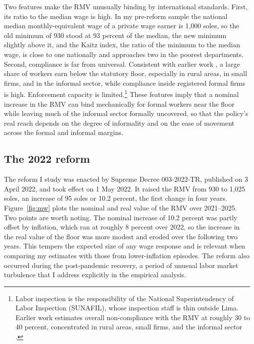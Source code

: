 Two features make the RMV unusually binding by international standards. First, its ratio to the median wage is high. In my pre-reform sample the national median monthly-equivalent wage of a private wage earner is 1,000 soles, so the old minimum of 930 stood at 93 percent of the median, the new minimum slightly above it, and the Kaitz index, the ratio of the minimum to the median wage, is close to one nationally and approaches two in the poorest departments. Second, compliance is far from universal. Consistent with earlier work \citep{jaramillo_lopez_2006, cespedes_2005}, a large share of workers earn below the statutory floor, especially in rural areas, in small firms, and in the informal sector, while compliance inside registered formal firms is high. Enforcement capacity is limited.\footnote{Labor inspection is the responsibility of the National Superintendency of Labor Inspection (SUNAFIL), whose inspection staff is thin outside Lima. Earlier work estimates overall non-compliance with the RMV at roughly 30 to 40 percent, concentrated in rural areas, small firms, and the informal sector \citep{jaramillo_lopez_2006, cespedes_2005}.} These features imply that a nominal increase in the RMV can bind mechanically for formal workers near the floor while leaving much of the informal sector formally uncovered, so that the policy's real reach depends on the degree of informality and on the ease of movement across the formal and informal margins.

\subsection{The 2022 reform}

The reform I study was enacted by Supreme Decree 003-2022-TR, published on 3 April 2022, and took effect on 1 May 2022. It raised the RMV from 930 to 1,025 soles, an increase of 95 soles or 10.2 percent, the first change in four years. Figure~\ref{fig:mw} plots the nominal and real value of the RMV over 2021--2025. Two points are worth noting. The nominal increase of 10.2 percent was partly offset by inflation, which ran at roughly 8 percent over 2022, so the increase in the real value of the floor was more modest and eroded over the following two years. This tempers the expected size of any wage response and is relevant when comparing my estimates with those from lower-inflation episodes. The reform also occurred during the post-pandemic recovery, a period of unusual labor market turbulence that I address explicitly in the empirical analysis.


